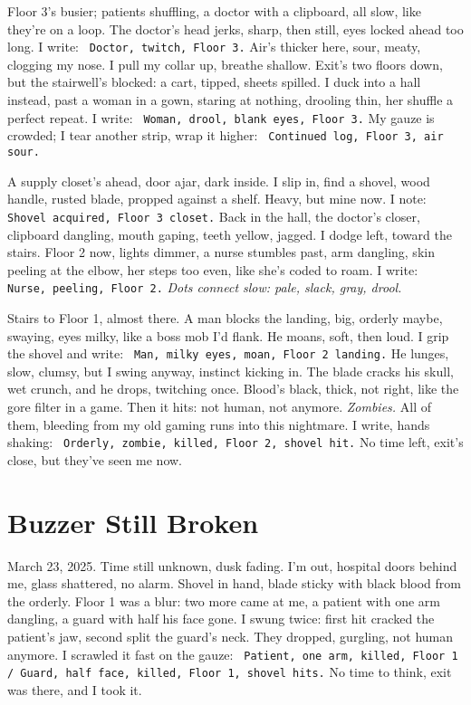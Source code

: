 \documentclass[12pt]{article} %
\newcommand{\note}[1]{\texttt{\small \color{DarkGray} #1}}
\begin{document}
Floor 3’s busier; patients shuffling, a doctor with a clipboard, all slow, like they’re on a loop. The doctor’s head jerks, sharp, then still, eyes locked ahead too long. I write: \note{Doctor, twitch, Floor 3.} Air’s thicker here, sour, meaty, clogging my nose. I pull my collar up, breathe shallow. Exit’s two floors down, but the stairwell’s blocked: a cart, tipped, sheets spilled. I duck into a hall instead, past a woman in a gown, staring at nothing, drooling thin, her shuffle a perfect repeat. I write: \note{Woman, drool, blank eyes, Floor 3.} My gauze is crowded; I tear another strip, wrap it higher: \note{Continued log, Floor 3, air sour.}

A supply closet’s ahead, door ajar, dark inside. I slip in, find a shovel, wood handle, rusted blade, propped against a shelf. Heavy, but mine now. I note: \note{Shovel acquired, Floor 3 closet.} Back in the hall, the doctor’s closer, clipboard dangling, mouth gaping, teeth yellow, jagged. I dodge left, toward the stairs. Floor 2 now, lights dimmer, a nurse stumbles past, arm dangling, skin peeling at the elbow, her steps too even, like she’s coded to roam. I write: \note{Nurse, peeling, Floor 2.} \textit{Dots connect slow: pale, slack, gray, drool.}

Stairs to Floor 1, almost there. A man blocks the landing, big, orderly maybe, swaying, eyes milky, like a boss mob I’d flank. He moans, soft, then loud. I grip the shovel and write: \note{Man, milky eyes, moan, Floor 2 landing.} He lunges, slow, clumsy, but I swing anyway, instinct kicking in. The blade cracks his skull, wet crunch, and he drops, twitching once. Blood’s black, thick, not right, like the gore filter in a game. Then it hits: not human, not anymore. \textit{Zombies.} All of them, bleeding from my old gaming runs into this nightmare. I write, hands shaking: \note{Orderly, zombie, killed, Floor 2, shovel hit.} No time left, exit’s close, but they’ve seen me now.

\section{Buzzer Still Broken}

March 23, 2025. Time still unknown, dusk fading. I’m out, hospital doors behind me, glass shattered, no alarm. Shovel in hand, blade sticky with black blood from the orderly. Floor 1 was a blur: two more came at me, a patient with one arm dangling, a guard with half his face gone. I swung twice: first hit cracked the patient’s jaw, second split the guard’s neck. They dropped, gurgling, not human anymore. I scrawled it fast on the gauze: \note{Patient, one arm, killed, Floor 1 / Guard, half face, killed, Floor 1, shovel hits.} No time to think, exit was there, and I took it.
\end{document}
